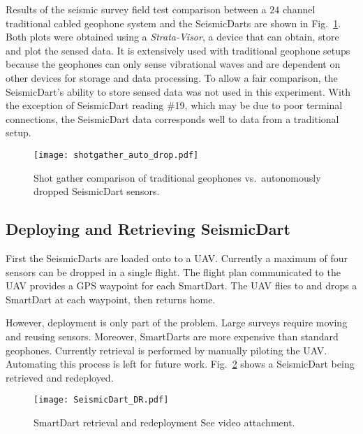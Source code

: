 Results of the seismic survey field test comparison between a $24$ channel traditional cabled geophone system and the SeismicDarts are shown in Fig.~\ref{fig:shotgather_auto_drop}.   
Both plots were obtained using a \emph{Strata-Visor}, a device that can obtain, store and plot the sensed data. 
It is extensively used with traditional geophone setups because the geophones can only sense vibrational waves and are dependent on other devices for storage and data processing. 
To allow a fair comparison, the SeismicDart's  ability to store sensed data was not used in this experiment. 
With the exception of SeismicDart reading \#19, which may be due to poor terminal connections, the SeismicDart data corresponds well to data from a traditional setup.


\begin{figure} \centering
  {\texttt{[image: shotgather\_auto\_drop.pdf]}}
 \caption{Shot gather comparison of traditional geophones vs.\ autonomously dropped SeismicDart sensors. 
 \label{fig:shotgather_auto_drop}}
\end{figure}

\subsection{Deploying and Retrieving SeismicDart}
First the SeismicDarts are loaded onto to a UAV. 
Currently a maximum of four sensors can be dropped in a single flight. 
The flight plan communicated to the UAV provides a GPS waypoint for each SmartDart. 
The UAV flies to and drops a SmartDart at each waypoint, then returns home. 

However, deployment is only part of the problem. Large surveys require moving and reusing sensors.  
Moreover, SmartDarts are more expensive than standard geophones. 
Currently retrieval is performed by manually piloting the UAV. 
Automating this process is left for future work.
Fig.~\ref{fig:SeismicDart_DR} shows a SeismicDart being retrieved and redeployed.


\begin{figure} \centering
  {\texttt{[image: SeismicDart\_DR.pdf]}}
 \caption{SmartDart retrieval and redeployment  See video  attachment. 
 \label{fig:SeismicDart_DR}}
\end{figure}
 